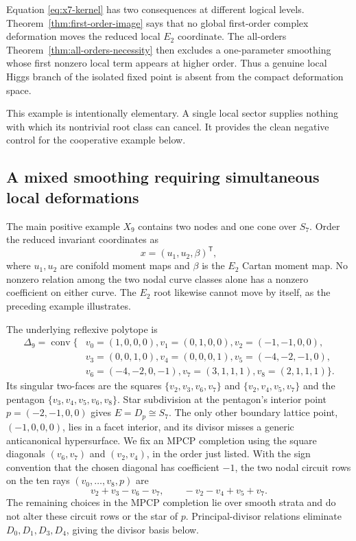 Equation \eqref{eq:x7-kernel} has two consequences at different logical
levels. Theorem~\ref{thm:first-order-image} says that no global first-order
complex deformation moves the reduced local $E_2$ coordinate. The
all-orders Theorem~\ref{thm:all-orders-necessity} then excludes a
one-parameter smoothing whose first nonzero local term appears at higher
order. Thus a genuine local Higgs branch of the isolated fixed point is absent
from the compact deformation space.

This example is intentionally elementary. A single local sector supplies
nothing with which its nontrivial root class can cancel. It provides the clean
negative control for the cooperative example below.

\subsection[A mixed smoothing requiring simultaneous local deformations]{A mixed smoothing requiring simultaneous local deformations}
\label{subsec:x9}

The main positive example $X_9$ contains two nodes and one cone over
$S_7$. Order the reduced invariant coordinates as
\begin{equation}
 x=(u_1,u_2,\beta)^{\mathsf T},
 \label{eq:x9-coordinates}
\end{equation}
where $u_1,u_2$ are conifold moment maps and $\beta$ is the $E_2$ Cartan
moment map. No nonzero relation among the two nodal curve classes alone has a
nonzero coefficient on either curve.
The $E_2$ root likewise cannot move by itself, as the preceding example
illustrates.

The underlying reflexive polytope is
\begin{equation}
\begin{split}
 \Delta_9=\operatorname{conv}\{&v_0=(1,0,0,0),v_1=(0,1,0,0),
 v_2=(-1,-1,0,0),\\
 &v_3=(0,0,1,0),v_4=(0,0,0,1),v_5=(-4,-2,-1,0),\\
 &v_6=(-4,-2,0,-1),v_7=(3,1,1,1),v_8=(2,1,1,1)\}.
\end{split}
 \label{eq:x9-polytope}
\end{equation}
Its singular two-faces are the squares
$\{v_2,v_3,v_6,v_7\}$ and $\{v_2,v_4,v_5,v_7\}$ and the pentagon
$\{v_3,v_4,v_5,v_6,v_8\}$. Star subdivision at the pentagon's interior
point $p=(-2,-1,0,0)$ gives $E=D_p\cong S_7$. The only other boundary
lattice point, $(-1,0,0,0)$, lies in a facet interior, and its divisor misses
a generic anticanonical hypersurface. We fix an MPCP completion using the
square diagonals $(v_6,v_7)$ and $(v_2,v_4)$, in the order just listed. With
the sign convention that the chosen diagonal has coefficient $-1$, the two
nodal circuit rows on the ten rays $(v_0,\ldots,v_8,p)$ are
\begin{equation}
 v_2+v_3-v_6-v_7,
 \qquad
 -v_2-v_4+v_5+v_7.
 \label{eq:x9-node-circuits}
\end{equation}
The remaining choices in the MPCP completion lie over smooth strata and do
not alter these circuit rows or the star of $p$. Principal-divisor relations eliminate
$D_0,D_1,D_3,D_4$, giving the divisor basis below.

